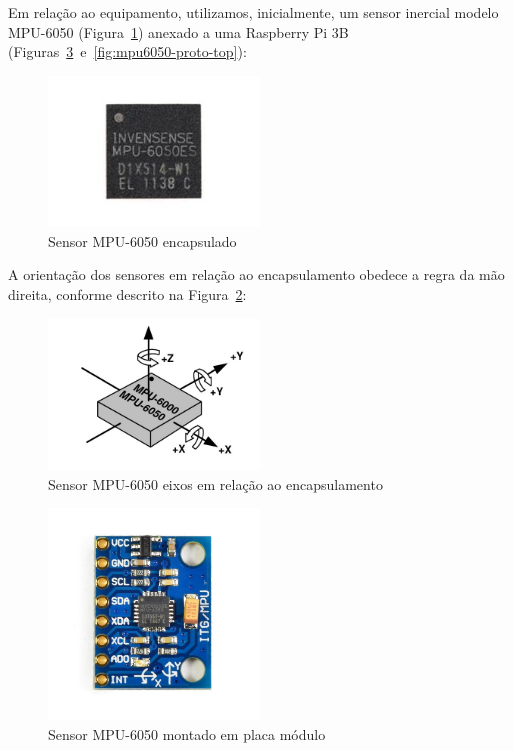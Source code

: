 Em relação ao equipamento, utilizamos, inicialmente, um sensor inercial modelo MPU-6050 (Figura~\ref{fig:mpu6050-sensor-top}) anexado a uma Raspberry Pi 3B (Figuras~\ref{fig:mpu6050-board-top}~e~\ref{fig:mpu6050-proto-top}):
\begin{figure}[H]
    \centering
    \caption{Sensor MPU-6050 encapsulado}\label{fig:mpu6050-sensor-top}
    \includegraphics[width=0.5\textwidth]{figuras/mpu6050-sensor-top-straight.jpg}
\end{figure}
A orientação dos sensores em relação ao encapsulamento obedece a regra da mão direita, conforme descrito na Figura~\ref{fig:mpu6050-diagram-axis}:
\begin{figure}[H]
    \centering
    \caption{Sensor MPU-6050 eixos em relação ao encapsulamento}\label{fig:mpu6050-diagram-axis}
    \includegraphics[width=0.5\textwidth]{figuras/mpu6050-diagram-axis.jpg}
\end{figure}
\begin{figure}[H]
    \centering
    \caption{Sensor MPU-6050 montado em placa módulo}\label{fig:mpu6050-board-top}
    \includegraphics[width=0.5\textwidth]{figuras/mpu6050-board-top.jpg}
\end{figure}
